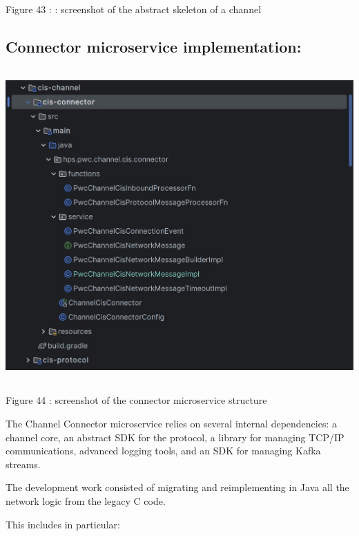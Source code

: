 \documentclass[12pt,a4paper]{report}
\begin{document}
\protect\hypertarget{_Toc201954519}{}{}Figure 43 : : screenshot of the
abstract skeleton of a channel

\hypertarget{connector-microservice-implementation}{%
\subsection{\texorpdfstring{\textbf{Connector microservice
implementation:}}{Connector microservice implementation:}}\label{connector-microservice-implementation}}

\includegraphics[width=5.64967in,height=4.69792in]{vertopal_d1b0b2209edd4c6aa8254f57daa0953b/media/image63.jpg}

\protect\hypertarget{_Toc201954520}{}{}Figure 44 : screenshot of the
connector microservice structure

The Channel Connector microservice relies on several internal
dependencies: a channel core, an abstract SDK for the protocol, a
library for managing TCP/IP communications, advanced logging tools, and
an SDK for managing Kafka streams.

The development work consisted of migrating and reimplementing in Java
all the network logic from the legacy C code.

This includes in particular:
\end{document}
